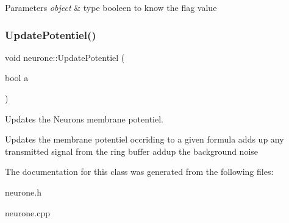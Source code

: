 \begin{DoxyParams}{Parameters}
{\em object} & type booleen to know the flag value \\
\hline
\end{DoxyParams}
\mbox{\label{classneurone_a374a8ad3b73985a8e5fff35bf5e223f7}} 
\subsubsection{\texorpdfstring{Update\+Potentiel()}{UpdatePotentiel()}}
{\footnotesize\ttfamily void neurone\+::\+Update\+Potentiel (\begin{DoxyParamCaption}\item[{bool}]{a }\end{DoxyParamCaption})}



Updates the Neuron\textquotesingle{}s membrane potentiel. 

Updates the membrane potentiel occriding to a given formula add\textquotesingle{}s up any transmitted signal from the ring buffer add\textquotesingle{}up the background noise 

The documentation for this class was generated from the following files\+:\begin{DoxyCompactItemize}
\item 
neurone.\+h\item 
neurone.\+cpp\end{DoxyCompactItemize}
